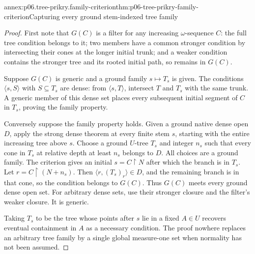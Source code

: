 \begin{annexitem}{annex:p06.tree-prikry.family-criterion}{thm:p06-tree-prikry-family-criterion}{Capturing every ground stem-indexed tree family}
\begin{proof}
First note that \(G(C)\) is a filter for any increasing \(\omega\)-sequence
\(C\): the full tree condition belongs to it; two members have a
common stronger condition by intersecting their cones at the longer
initial trunk; and a weaker condition contains the stronger tree and
its rooted initial path, so remains in \(G(C)\).

Suppose \(G(C)\) is generic and a ground family \(s\mapsto T_s\)
is given. The conditions \(\langle s,S\rangle\) with
\(S\subseteq T_s\) are dense: from \(\langle s,T\rangle\), intersect
\(T\) and \(T_s\) with the same trunk. A generic member of this
dense set places every subsequent initial segment of \(C\) in
\(T_s\), proving the family property.

Conversely suppose the family property holds. Given a ground native
dense open \(D\), apply the strong dense theorem at every finite
stem \(s\), starting with the entire increasing tree above \(s\).
Choose a ground \(U\)-tree \(T_s\) and integer \(n_s\) such that
every cone in \(T_s\) at relative depth at least \(n_s\) belongs
to \(D\). All choices are a ground family. The criterion gives an
initial \(s=C\mathbin{\upharpoonright}N\) after which the branch
is in \(T_s\). Let \(r=C\mathbin{\upharpoonright}(N+n_s)\).
Then \(\langle r,(T_s)_r\rangle\in D\), and the remaining branch
is in that cone, so the condition belongs to \(G(C)\). Thus \(G(C)\)
meets every ground dense open set. For arbitrary dense sets, use their
stronger closure and the filter's weaker closure. It is generic.

Taking \(T_s\) to be the tree whose points after \(s\) lie in a
fixed \(A\in U\) recovers eventual containment in \(A\) as a necessary
condition. The proof nowhere replaces an arbitrary tree family by a
single global measure-one set when normality has not been assumed.
\end{proof}
\end{annexitem}

